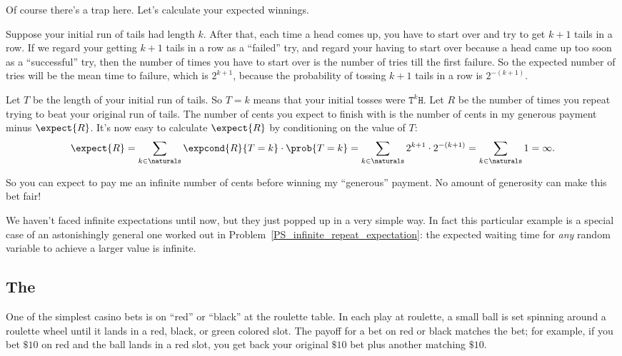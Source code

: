 Of course there's a trap here.  Let's calculate your expected
winnings.

Suppose your initial run of tails had length $k$.  After that, each
time a head comes up, you have to start over and try to get $k+1$ tails
in a row.  If we regard your getting $k+1$ tails in a row as a
``failed'' try, and regard your having to start over because a head
came up too soon as a ``successful'' try, then the number of times you
have to start over is the number of tries till the first failure.  So
the expected number of tries will be the mean time to failure, which is
$2^{k+1}$, because the probability of tossing $k+1$ tails in a row is
$2^{-(k+1)}$.

Let $T$ be the length of your initial run of tails.  So $T = k$ means
that your initial tosses were $\texttt{T}^k\texttt{H}$.  Let $R$ be
the number of times you repeat trying to beat your original run of
tails.  The number of cents you expect to finish with is the number of
cents in my generous payment minus $\expect{R}$.  It's now easy to
calculate $\expect{R}$ by conditioning on the value of $T$:
\[
\expect{R}
     = \sum_{k \in \naturals} \expcond{R}{T=k} \cdot \prob{T=k}
     = \sum_{k \in \naturals}  2^{k+1} \cdot 2^{-(k+1)}
     = \sum_{k \in \naturals} 1 = \infty.
\]

\iffalse
\begin{align*}
\expect{R}
    & = \sum_{k \in \naturals} \expcond{R}{T=k} \cdot \prob{T=k}\\
    & = \sum_{k \in \naturals}  2^{k+1} \cdot 2^{-(k+1)}\\
    & = \sum_{k \in \naturals} 1 = \infty.
\end{align*}
\fi

So you can expect to pay me an infinite number of cents before winning
my ``generous'' payment.  No amount of generosity can make this bet
fair!

We haven't faced infinite expectations until now, but they just popped
up in a very simple way.  In fact this particular example is a special
case of an astonishingly general one worked out in
Problem~\ref{PS_infinite_repeat_expectation}: the expected waiting
time for \emph{any} random variable to achieve a larger value is
infinite.

\subsection{The }

One of the simplest casino bets is on ``red'' or ``black'' at the roulette
table.  In each play at roulette, a small ball is set spinning around a
roulette wheel until it lands in a red, black, or green colored slot.
The payoff for a bet on red or black matches the bet; for example, if you bet
$\$10$ on red and the ball lands in a red slot, you get back your original
$\$10$ bet plus another matching $\$10$.

